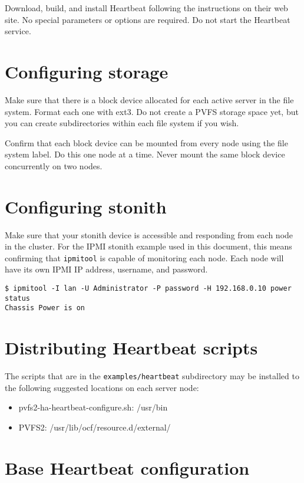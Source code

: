 \documentclass[11pt]{article}
\begin{document}
Download, build, and install Heartbeat following the instructions on
their web site.  No special parameters or options are required.  Do not
start the Heartbeat service.

\section{Configuring storage}

Make sure that there is a block device allocated for each active server
in the file system.  Format each one with ext3.  Do not create a PVFS
storage space yet, but you can create subdirectories within each file
system if you wish.

Confirm that each block device can be mounted from every node using the
file system label.  Do this one node at a time.  Never mount
the same block device concurrently on two nodes.

\section{Configuring stonith}

Make sure that your stonith device is accessible and responding from each
node in the cluster.  For the IPMI stonith example used in this document,
this means confirming that \texttt{ipmitool} is capable of monitoring
each node.  Each node will have its own IPMI IP address, username, and
password.

\begin{verbatim}
$ ipmitool -I lan -U Administrator -P password -H 192.168.0.10 power status
Chassis Power is on
\end{verbatim}

\section{Distributing Heartbeat scripts}

The scripts that are in the \texttt{examples/heartbeat} subdirectory may be
installed to the following suggested locations on each server node:
\begin{itemize}
\item pvfs2-ha-heartbeat-configure.sh: /usr/bin
\item PVFS2: /usr/lib/ocf/resource.d/external/
\end{itemize}

\section{Base Heartbeat configuration}
\end{document}
